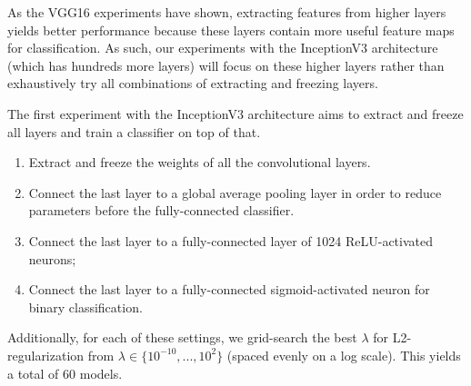As the VGG16 experiments have shown, extracting features from higher layers yields better performance because these layers contain more useful feature maps for classification. As such, our experiments with the InceptionV3 architecture (which has hundreds more layers) will focus on these higher layers rather than exhaustively try all combinations of extracting and freezing layers.

The first experiment with the InceptionV3 architecture aims to extract and freeze all layers and train a classifier on top of that.

\begin{enumerate}
    \item Extract and freeze the weights of all the convolutional layers.
    \item Connect the last layer to a global average pooling layer in order to reduce parameters before the fully-connected classifier.
    \item Connect the last layer to a fully-connected layer of 1024 ReLU-activated neurons;
    \item Connect the last layer to a fully-connected sigmoid-activated neuron for binary classification.
\end{enumerate}

Additionally, for each of these settings, we grid-search the best $\lambda$ for L2-regularization from $\lambda \in \{10^{-10}, ..., 10^{2}\}$ (spaced evenly on a log scale). This yields a total of $60$ models.

